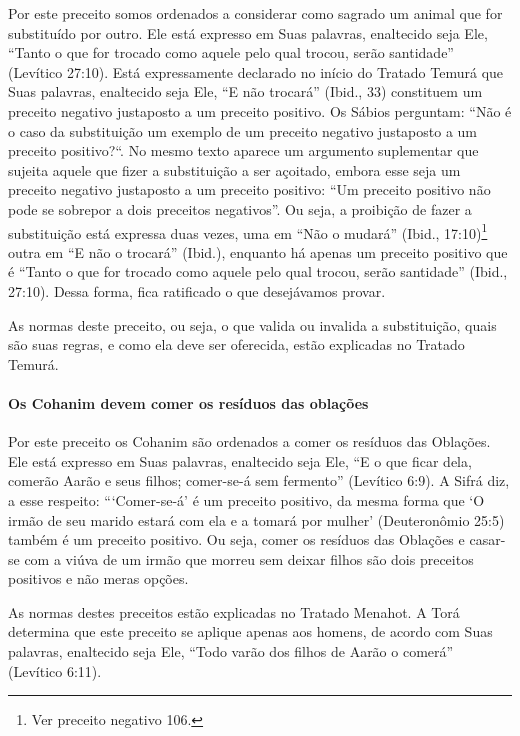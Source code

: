 Por este preceito somos ordenados a considerar como sagrado um animal
que for substituído por outro. Ele está expresso em Suas palavras,
enaltecido seja Ele, ``Tanto o que for trocado como aquele pelo qual
trocou, serão santidade'' (Levítico 27:10). Está expressamente
declarado no início do Tratado Temurá que Suas palavras, enaltecido
seja Ele, ``E não trocará'' (Ibid., 33) constituem um preceito negativo
justaposto a um preceito positivo. Os Sábios perguntam: ``Não é o caso
da substituição um exemplo de um preceito negativo justaposto a um
preceito positivo?``. No mesmo texto aparece um argumento suplementar
que sujeita aquele que fizer a substituição a ser açoitado, embora esse
seja um preceito negativo justaposto a um preceito positivo: ``Um
preceito positivo não pode se sobrepor a dois preceitos negativos''. Ou
seja, a proibição de fazer a substituição está expressa duas vezes, uma
em ``Não o mudará'' (Ibid., 17:10)\footnote{Ver preceito negativo 106.} outra em ``E
não o trocará'' (Ibid.), enquanto há apenas um preceito positivo que é
``Tanto o que for trocado como aquele pelo qual trocou, serão
santidade'' (Ibid., 27:10). Dessa forma, fica ratificado o que
desejávamos provar.

As normas deste preceito, ou seja, o que valida ou invalida a
substituição, quais são suas regras, e como ela deve ser oferecida,
estão explicadas no Tratado Temurá.

\paragraph{Os Cohanim devem comer os resíduos das oblações}

Por este preceito os Cohanim são ordenados a comer os resíduos das
Oblações. Ele está expresso em Suas palavras, enaltecido seja Ele, ``E o
que ficar dela, comerão Aarão e seus filhos; comer-se-á sem fermento''
(Levítico 6:9). A Sifrá diz, a esse respeito: ```Comer-se-á' é um
preceito positivo, da mesma forma que `O irmão de seu marido estará com
ela e a tomará por mulher' (Deuteronômio 25:5) também é um preceito
positivo. Ou seja, comer os resíduos das Oblações e casar-se com a viúva
de um irmão que morreu sem deixar filhos são dois preceitos positivos e
não meras opções.

As normas destes preceitos estão explicadas no Tratado Menahot. A Torá
determina que este preceito se aplique apenas aos homens, de acordo com
Suas palavras, enaltecido seja Ele, ``Todo varão dos filhos de Aarão o
comerá'' (Levítico 6:11).

